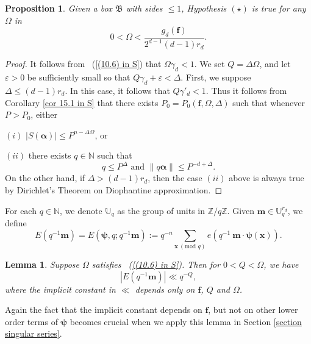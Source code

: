 \documentclass[12pt]{amsart}
\newtheorem{lem}[thm]{Lemma}
\newtheorem{prop}[thm]{Proposition}
\theoremstyle{definition}
\theoremstyle{remark}
\numberwithin{equation}{section}
\begin{document}
\begin{prop}\cite[Proposition $\text{II}_0$]{S}
\label{prop omega and g}
Given a box $\mathfrak{B}$ with sides $\leq 1$, Hypothesis $(\star)$ is true for any $\Omega$ in
\begin{equation}
\label{(10.6) in S}
0 < \Omega < \frac{g_d( \mathbf{f} )}{2^{d-1} (d-1) r_d}.
\end{equation}

\end{prop}

\begin{proof}
It follows from ~(\ref{(10.6) in S}) that
$ \Omega \gamma_d < 1$.
We set $Q = \Delta \Omega$, and let $\varepsilon > 0$ be sufficiently small so that $Q \gamma_d + \varepsilon < \Delta$.
First, we suppose $\Delta \leq (d-1)r_d$. In this case, it follows that $Q \gamma'_d < 1$.
Thus it follows from Corollary \ref{cor 15.1 in S} that there exists $P_0 = P_0( \mathbf{f}, \Omega, \Delta)$ such that whenever $P > P_0$, either

$(i)$ $|S (\boldsymbol{\alpha})| \leq P^{n - \Delta \Omega}$, or

$(ii)$ there exists $q \in \mathbb{N}$ such that
$$
q \leq P^{\Delta} \text{ and } \|  q \boldsymbol{\alpha} \| \leq P^{-d + \Delta}.
$$
On the other hand, if $\Delta > (d-1)r_d$, then the case $(ii)$ above is always true by Dirichlet's Theorem on Diophantine approximation.
\end{proof}

For each $q \in \mathbb{N}$, we denote $\mathbb{U}_q$ as the group of units in $\mathbb{Z}/ q \mathbb{Z}.$ 
Given $\mathbf{m} \in \mathbb{U}_q^{r_d}$, we define
\begin{equation}
\label{def of E}
E(q^{-1} \mathbf{m}) = E( \boldsymbol{\psi}, q ; q^{-1} \mathbf{m} ) := q^{-n} \sum_{ \mathbf{x} \ (\text{mod }q) } e(q^{-1} \ \mathbf{m} \cdot \boldsymbol{\psi} (\mathbf{x}) ).
\end{equation}

\begin{lem}\cite[Lemma 7.1]{S}
\label{bound on E}
Suppose $\Omega$ satisfies ~(\ref{(10.6) in S}).
Then for $0 < Q < \Omega$, we have
\begin{equation}
\label{(7.1) in S}
| E (q^{-1} \mathbf{m} ) | \ll q^{- Q},
\end{equation}
where the implicit constant in $\ll$ depends only on $\mathbf{f}$, $Q$ and $\Omega$.
\end{lem}
Again the fact that the implicit constant depends on $\mathbf{f}$, but not
on other lower order terms of $\boldsymbol{\psi}$ becomes crucial when we apply this lemma in Section \ref{section singular series}.
\end{document}
